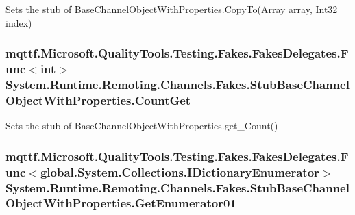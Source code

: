 Sets the stub of Base\-Channel\-Object\-With\-Properties.\-Copy\-To(\-Array array, Int32 index)

\hypertarget{class_system_1_1_runtime_1_1_remoting_1_1_channels_1_1_fakes_1_1_stub_base_channel_object_with_properties_a8ddc77b2c0b27eb4566fb2c3f150a402}{
\subsubsection[{Count\-Get}]{\setlength{\rightskip}{0pt plus 5cm}mqttf.\-Microsoft.\-Quality\-Tools.\-Testing.\-Fakes.\-Fakes\-Delegates.\-Func$<$int$>$ System.\-Runtime.\-Remoting.\-Channels.\-Fakes.\-Stub\-Base\-Channel\-Object\-With\-Properties.\-Count\-Get}}\label{class_system_1_1_runtime_1_1_remoting_1_1_channels_1_1_fakes_1_1_stub_base_channel_object_with_properties_a8ddc77b2c0b27eb4566fb2c3f150a402}


Sets the stub of Base\-Channel\-Object\-With\-Properties.\-get\-\_\-\-Count()

\hypertarget{class_system_1_1_runtime_1_1_remoting_1_1_channels_1_1_fakes_1_1_stub_base_channel_object_with_properties_a7c576f385a752c65941d96d227fc579c}{
\subsubsection[{Get\-Enumerator01}]{\setlength{\rightskip}{0pt plus 5cm}mqttf.\-Microsoft.\-Quality\-Tools.\-Testing.\-Fakes.\-Fakes\-Delegates.\-Func$<$global.\-System.\-Collections.\-I\-Dictionary\-Enumerator$>$ System.\-Runtime.\-Remoting.\-Channels.\-Fakes.\-Stub\-Base\-Channel\-Object\-With\-Properties.\-Get\-Enumerator01}}\label{class_system_1_1_runtime_1_1_remoting_1_1_channels_1_1_fakes_1_1_stub_base_channel_object_with_properties_a7c576f385a752c65941d96d227fc579c}


